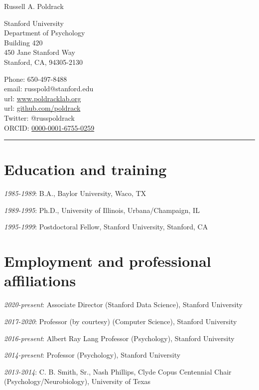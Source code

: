 \documentclass[10pt, letterpaper]{article}
\begin{document}
\reversemarginpar 
{\LARGE Russell A. Poldrack}\\[4mm] 
\vspace{-1cm} 

\begin{multicols}{2} 
Stanford University\\
Department of Psychology\\
Building 420\\
450 Jane Stanford Way\\
Stanford, CA, 94305-2130\\

\columnbreak 

Phone: 650-497-8488 \\
email: russpold@stanford.edu \\
url: \href{http://www.poldracklab.org}{www.poldracklab.org} \\
url: \href{http://github.com/poldrack}{github.com/poldrack} \\
Twitter: @russpoldrack \\
ORCID: \href{https://orcid.org/0000-0001-6755-0259}{0000-0001-6755-0259} \\
\end{multicols}

\hrule

\section*{Education and training}
\noindent
\textit{1985-1989}: B.A., Baylor University, Waco, TX

\textit{1989-1995}: Ph.D., University of Illinois, Urbana/Champaign, IL

\textit{1995-1999}: Postdoctoral Fellow, Stanford University, Stanford, CA


\section*{Employment and professional aﬀiliations}
\noindent
\textit{2020-present}: Associate Director (Stanford Data Science), Stanford University

\textit{2017-2020}: Professor (by courtesy) (Computer Science), Stanford University

\textit{2016-present}: Albert Ray Lang Professor (Psychology), Stanford University

\textit{2014-present}: Professor (Psychology), Stanford University

\textit{2013-2014}: C. B. Smith, Sr., Nash Phillips, Clyde Copus Centennial Chair (Psychology/Neurobiology), University of Texas
\end{document}

